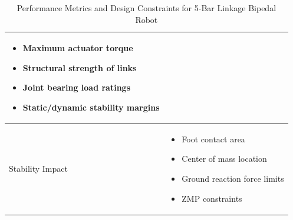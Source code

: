 \documentclass[12pt]{article}
\begin{document}
\begin{table}[H]
{\begin{tabularx}{\textwidth}{|X|X|}
\begin{itemize}
        \item Maximum actuator torque
        \item Structural strength of links
        \item Joint bearing load ratings
        \item Static/dynamic stability margins
    \end{itemize} \\
    \hline
    Stability Impact & 
    \begin{itemize}
        \item Foot contact area
        \item Center of mass location
        \item Ground reaction force limits
        \item ZMP constraints
    \end{itemize} \\
    \hline
    \end{tabularx}
}
\caption{Performance Metrics and Design Constraints for 5-Bar Linkage Bipedal Robot}
\label{tab:metrics}
\end{table}
\end{document}
